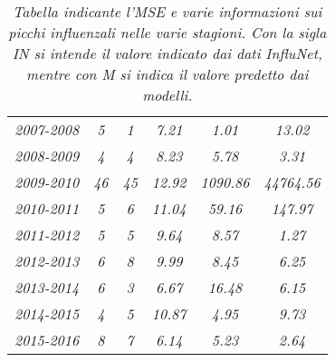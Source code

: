 \begin{table}[p]
\begin{adjustbox}{max width=\textwidth}
\begin{tabular}{|c|c|c|c|c|c|}
\rowcolor[HTML]{EFEFEF} 
\multicolumn{6}{|c|}{\cellcolor[HTML]{EFEFEF}Modello di Poisson} \\ \hline
\textit{2007-2008}            & \textit{5}                          & \textit{1}                    & \textit{7.21}           & \textit{1.01}     & \textit{13.02}    \\ \hline
\rowcolor[HTML]{FFFFFF} 
\textit{2008-2009}            & \textit{4}                          & \textit{4}                    & \textit{8.23}           & \textit{5.78}     & \textit{3.31}     \\ \hline
\rowcolor[HTML]{FFFFFF} 
\textit{2009-2010}            & \textit{46}                         & \textit{45}                   & \textit{12.92}          & \textit{1090.86}  & \textit{44764.56} \\ \hline
\rowcolor[HTML]{FFFFFF} 
\textit{2010-2011}            & \textit{5}                          & \textit{6}                    & \textit{11.04}          & \textit{59.16}    & \textit{147.97}   \\ \hline
\rowcolor[HTML]{FFFFFF} 
\textit{2011-2012}            & \textit{5}                          & \textit{5}                    & \textit{9.64}           & \textit{8.57}     & \textit{1.27}     \\ \hline
\rowcolor[HTML]{FFFFFF} 
\textit{2012-2013}            & \textit{6}                          & \textit{8}                    & \textit{9.99}           & \textit{8.45}     & \textit{6.25}     \\ \hline
\rowcolor[HTML]{FFFFFF} 
\textit{2013-2014}            & \textit{6}                          & \textit{3}                    & \textit{6.67}           & \textit{16.48}    & \textit{6.15}     \\ \hline
\rowcolor[HTML]{FFFFFF} 
\textit{2014-2015}            & \textit{4}                          & \textit{5}                    & \textit{10.87}          & \textit{4.95}     & \textit{9.73}     \\ \hline
\rowcolor[HTML]{FFFFFF} 
\textit{2015-2016}            & \textit{8}                          & \textit{7}                    & \textit{6.14}           & \textit{5.23}     & \textit{2.64}     \\ \hline
\end{tabular}
\end{adjustbox}
\caption{\textit{Tabella indicante l'MSE e varie informazioni sui picchi influenzali nelle varie stagioni. Con la sigla IN si intende il valore indicato dai dati InfluNet, mentre con M si indica il valore predetto dai modelli.}}
\label{tab:models_results}
\end{table}
\bigskip

